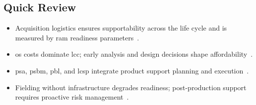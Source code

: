 \documentclass[../main.tex]{subfiles}
\begin{document}
\subsection{Quick Review}
\begin{itemize}
  \item Acquisition logistics ensures supportability across the life cycle and is measured by \ac{ram} readiness parameters~\autocite{edo-3-5-4-acquisition-logistics-2025}.
  \item \ac{os} costs dominate \ac{lcc}; early analysis and design decisions shape affordability~\autocite{edo-3-5-4-acquisition-logistics-2025}.
  \item \ac{psa}, \ac{psbm}, \ac{pbl}, and \ac{lcsp} integrate product support planning and execution~\autocite{edo-3-5-4-acquisition-logistics-2025}.
  \item Fielding without infrastructure degrades readiness; post-production support requires proactive risk management~\autocite{edo-3-5-4-acquisition-logistics-2025}.
\end{itemize}

\end{document}
